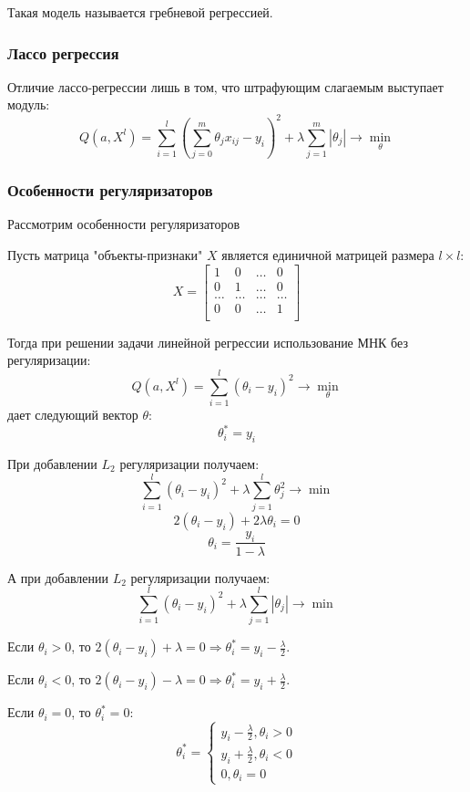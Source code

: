 \documentclass[aps,%
12pt,%
final,%
oneside,
onecolumn,%
musixtex, %
superscriptaddress,%
centertags]{article} %
\theoremstyle{plain}
\theoremstyle{definition}
\theoremstyle{remark}
\begin{document}
Такая модель называется гребневой регрессией.

\subsubsection{Лассо регрессия}

Отличие лассо-регрессии лишь в том, что штрафующим слагаемым выступает модуль:
$$Q(a,X^l) = \sum\limits_{i=1}^l \left(\sum\limits_{j=0}^m \theta_jx_{ij}-y_i\right)^2 + \lambda \sum\limits_{j=1}^m |\theta_j| \to \underset{\theta}{\min}$$

\subsubsection{Особенности регуляризаторов}

Рассмотрим особенности регуляризаторов

Пусть матрица "объекты-признаки" $X$ является единичной матрицей размера $l \times l$:
$$X = \begin{bmatrix}
	1 & 0 & \ldots & 0 \\
	0 & 1 & \ldots & 0 \\ 
	\ldots & \ldots & \ldots & \ldots \\ 
	0 & 0 & \ldots & 1 \\  
\end{bmatrix}$$

Тогда при решении задачи линейной регрессии использование МНК без регуляризации:
$$Q(a,X^l) = \sum\limits_{i=1}^l (\theta_i - y_i)^2 \to \underset{\theta}{\min}$$
дает следующий вектор $\theta$:
$$\theta_i^* = y_i$$

При добавлении $L_2$ регуляризации получаем:
$$\sum\limits_{i=1}^l (\theta_i - y_i)^2 + \lambda \sum\limits_{j=1}^l \theta_j^2 \to \min$$
$$2(\theta_i - y_i) + 2\lambda \theta_i = 0 $$
$$\theta_i = \frac{y_i}{1-\lambda}$$

А при добавлении $L_2$ регуляризации получаем:
$$\sum\limits_{i=1}^l (\theta_i - y_i)^2 + \lambda \sum\limits_{j=1}^l |\theta_j| \to \min$$

Если $\theta_i >0$, то $2(\theta_i - y_i) + \lambda = 0 \Longrightarrow \theta_i^* = y_i - \frac{\lambda}{2}$. 

Если $\theta_i < 0$, то $2(\theta_i - y_i)  -  \lambda = 0 \Longrightarrow \theta_i^* = y_i + \frac{\lambda}{2}$. 

Если $\theta_i = 0$, то $\theta_i^* = 0$:
$$\theta_i^* = \begin{cases}
	y_i - \frac{\lambda}{2}, \theta_i > 0 \\
	y_i + \frac{\lambda}{2}, \theta_i < 0 \\
	0, \theta_i = 0
\end{cases}$$
\end{document}
